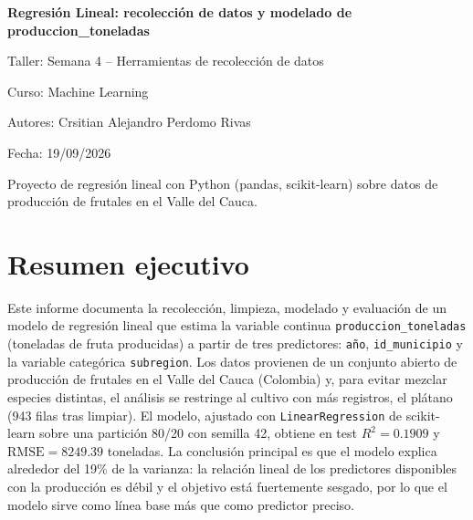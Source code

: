 \documentclass[11pt,a4paper]{article}
\begin{document}
\begin{titlepage}
  \centering
  \vspace*{2.5cm}

  {\LARGE\bfseries Regresión Lineal: recolección de datos y modelado de produccion\_toneladas\par}

  \vspace{1.5cm}

  {\large Taller: Semana 4 -- Herramientas de recolección de datos\par}

  \vspace{2.5cm}

  {\large Curso: Machine Learning\par}
  \vspace{0.4cm}
  {\large Autores: Crsitian Alejandro Perdomo Rivas\par}
  \vspace{0.4cm}
  {\large Fecha: 19/09/2026\par}

  \vfill

  {\normalsize Proyecto de regresión lineal con Python (pandas, scikit-learn) sobre datos de
  producción de frutales en el Valle del Cauca.\par}
\end{titlepage}

\setcounter{page}{1}

\section{Resumen ejecutivo}

Este informe documenta la recolección, limpieza, modelado y evaluación de un modelo de regresión
lineal que estima la variable continua \texttt{produccion\_toneladas} (toneladas de fruta
producidas) a partir de tres predictores: \texttt{año}, \texttt{id\_municipio} y la variable
categórica \texttt{subregion}. Los datos provienen de un conjunto abierto de producción de frutales
en el Valle del Cauca (Colombia) y, para evitar mezclar especies distintas, el análisis se
restringe al cultivo con más registros, el plátano (943 filas tras limpiar). El modelo, ajustado
con \texttt{LinearRegression} de scikit-learn sobre una partición 80/20 con semilla 42, obtiene en
test $R^2 = 0.1909$ y $\mathrm{RMSE} = 8249.39$ toneladas. La conclusión principal es que el
modelo explica alrededor del 19\% de la varianza: la relación lineal de los predictores disponibles
con la producción es débil y el objetivo está fuertemente sesgado, por lo que el modelo sirve como
línea base más que como predictor preciso.
\end{document}
